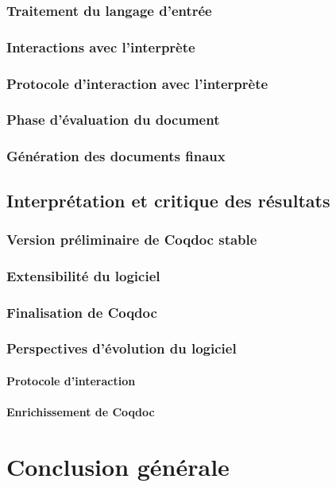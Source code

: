 \documentclass[a4paper, 11pt]{report}
\begin{document}
    \subsection{Traitement du langage d'entrée}
    \subsection{Interactions avec l'interprète}
    \subsection{Protocole d'interaction avec l'interprète} %
    \subsection{Phase d'évaluation du document}
    \subsection{Génération des documents finaux}
  \section{Interprétation et critique des résultats}
    \subsection{Version préliminaire de Coqdoc stable}
    \subsection{Extensibilité du logiciel}
    \subsection{Finalisation de Coqdoc}
    \subsection{Perspectives d'évolution du logiciel}
    \subsubsection{Protocole d'interaction}
    \subsubsection{Enrichissement de Coqdoc}
\chapter{Conclusion générale}

\end{document}
